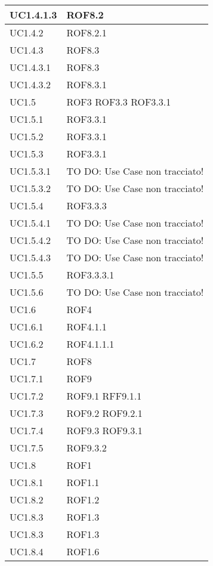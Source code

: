 \begin{center}
\begin{longtable}{| p{4cm} | p{4cm} |}
\hline
UC1.4.1.3 & ROF8.2 \\
\hline
UC1.4.2 & ROF8.2.1 \\
\hline
UC1.4.3 & ROF8.3 \\
\hline
UC1.4.3.1 & ROF8.3 \\
\hline
UC1.4.3.2 & ROF8.3.1 \\
\hline
UC1.5 & ROF3 \newline ROF3.3 \newline ROF3.3.1 \\
\hline
UC1.5.1 & ROF3.3.1 \\
\hline
UC1.5.2 & ROF3.3.1 \\
\hline
UC1.5.3 & ROF3.3.1 \\
\hline
UC1.5.3.1 & TO DO: Use Case non tracciato! \\
\hline
UC1.5.3.2 & TO DO: Use Case non tracciato! \\
\hline
UC1.5.4 & ROF3.3.3 \\
\hline
UC1.5.4.1 & TO DO: Use Case non tracciato! \\
\hline
UC1.5.4.2 & TO DO: Use Case non tracciato! \\
\hline
UC1.5.4.3 & TO DO: Use Case non tracciato! \\
\hline
UC1.5.5 & ROF3.3.3.1 \\
\hline
UC1.5.6 & TO DO: Use Case non tracciato! \\
\hline
UC1.6 & ROF4 \\
\hline
UC1.6.1 & ROF4.1.1 \\
\hline
UC1.6.2 & ROF4.1.1.1 \\
\hline
UC1.7 & ROF8 \\
\hline
UC1.7.1 & ROF9 \\
\hline
UC1.7.2 & ROF9.1 \newline RFF9.1.1 \\
\hline
UC1.7.3 & ROF9.2 \newline ROF9.2.1 \\
\hline
UC1.7.4 & ROF9.3 \newline ROF9.3.1 \\
\hline
UC1.7.5 & ROF9.3.2 \\
\hline
UC1.8 & ROF1 \\
\hline
UC1.8.1 & ROF1.1 \\
\hline
UC1.8.2 & ROF1.2 \\
\hline
UC1.8.3 & ROF1.3 \\
\hline
UC1.8.3 & ROF1.3 \\
\hline
UC1.8.4 & ROF1.6 \\
\hline

\end{longtable}
\end{center}

